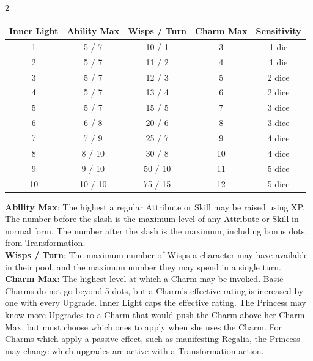 \begin{multicols}{2}
    \centering
    \begin{tabular}{|c|c|c|c|c|}
        \hline
        Inner Light & Ability Max & Wisps / Turn & Charm Max & Sensitivity \\ \hline
        1           & 5 / 7       & 10 / 1       & 3         & 1 die       \\ \hline
        2           & 5 / 7       & 11 / 2       & 4         & 1 die       \\ \hline
        3           & 5 / 7       & 12 / 3       & 5         & 2 dice      \\ \hline
        4           & 5 / 7       & 13 / 4       & 6         & 2 dice      \\ \hline
        5           & 5 / 7       & 15 / 5       & 7         & 3 dice      \\ \hline
        6           & 6 / 8       & 20 / 6       & 8         & 3 dice      \\ \hline
        7           & 7 / 9       & 25 / 7       & 9         & 4 dice      \\ \hline
        8           & 8 / 10       & 30 / 8       & 10        & 4 dice      \\ \hline
        9           & 9 / 10       & 50 / 10      & 11        & 5 dice      \\ \hline
        10          & 10 / 10     & 75 / 15     & 12        & 5 dice      \\
        \hline
    \end{tabular}
	\bigsidebarend

\noindent \textbf{Ability Max}: The highest a regular Attribute or Skill may be raised using XP. The number before the slash is the maximum level of any Attribute or Skill in normal form. The number after the slash is the maximum, including bonus dots, from Transformation.\\

\noindent \textbf{Wisps / Turn}: The maximum number of Wisps a character may have available in their pool, and the maximum number they may spend in a single turn.\\

\noindent \textbf{Charm Max}: The highest level at which a Charm may be invoked. Basic Charms do not go beyond 5 dots, but a Charm's effective rating is increased by one with every Upgrade. Inner Light caps the effective rating. The Princess may know more Upgrades to a Charm that would push the Charm above her Charm Max, but must choose which ones to apply when she uses the Charm. For Charms which apply a passive effect, such as manifesting Regalia, the Princess may change which upgrades are active with a Transformation action.\\


\end{multicols}
